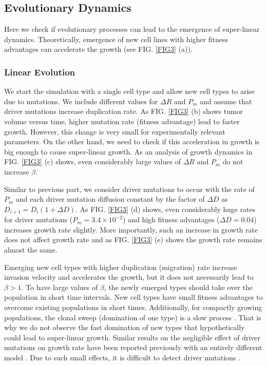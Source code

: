 \documentclass[aps,prl, superscriptaddress,groupedaddress]{revtex4}  %
\begin{document}
	\subsection{Evolutionary Dynamics}
	Here we check if evolutionary processes can lead to the emergence of super-linear dynamics. Theoretically, emergence of new cell lines with higher fitness advantages can accelerate the growth \cite{durrett2010evolutionary, Victor2020superlinear} (see FIG. \ref{FIG3} (a)).
	
	\subsubsection{Linear Evolution}
	We start the simulation with a single cell type and allow new cell types to arise due to mutations.  We include different values for  $\Delta R$ and $P_m$ and assume that driver mutations increase duplication rate. As FIG. \ref{FIG3} (b) shows tumor volume versus time, higher mutation rate (fitness advantage) lead to faster growth. However, this change is very small for experimentally relevant parameters. On the other hand, we need to check if this acceleration in growth is big enough to cause super-linear growth.  As an analysis of growth dynamics in  FIG. \ref{FIG3} (c) shows, even considerably large values of $\Delta R$ and $P_m$ do not increase $\beta$.  
	
	   Similar to previous part, we consider driver mutations to occur with the rate of $P_m$ and each driver mutation diffusion constant  by the factor of $\Delta D$ as $D_{i+1}=D_i (1+\Delta D)$. As FIG. \ref{FIG3} (d) shows, even considerably huge rates for driver mutations ($P_m=3.4 \times 10^{-2}$) and high fitness advantages ($\Delta D=0.04$) increases growth rate slightly. More importantly, such an increase in growth rate does not affect growth rate and as FIG. \ref{FIG3} (e) shows the growth rate remains almost the same. 
	
	 Emerging new cell types with higher duplication (migration) rate increase invasion velocity and accelerates the growth, but it does not necessarily lead to $\beta>1$. To have large values of $\beta$, the newly emerged types should take over the population in short time intervals. New cell types have small fitness advantages to overcome existing populations in short times. Additionally, for compactly growing populations, the clonal sweep (domination of one type) is a slow process \cite{hallatschek2014acceleration}. That is why we do not observe the fast domination of new types that hypothetically could lead to super-linear growth. Similar results on the negligible effect of driver mutations on growth rate have been reported previously with an entirely different model \cite{waclaw2015spatial}. Due to such small effects, it is difficult to detect driver mutations \cite{bozic2019measuring}.   
	
\end{document}
